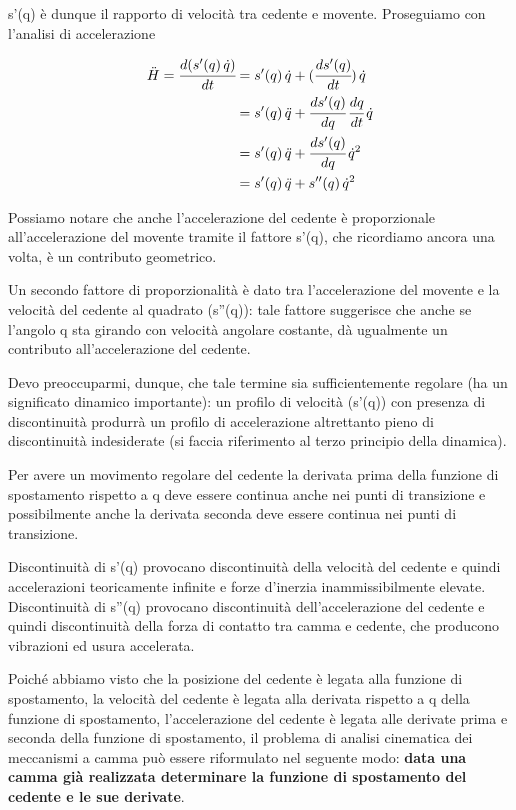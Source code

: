 	s'(q) è dunque il rapporto di velocità tra cedente e movente. Proseguiamo con l'analisi di accelerazione

	
		
		\begin{align*}
		\ddot{H} = \cfrac{d(s'(q)\,\dot{q})}{dt}&= s'(q)\,\dot{q} + (\cfrac{ds'(q)}{dt})\,\dot{q}\\
		&= s'(q) \,\ddot{q} + \cfrac{ds'(q)}{dq}\,\cfrac{dq}{dt}\,\dot{q}\\
		&= s'(q) \,\ddot{q} + \cfrac{ds'(q)}{dq}\,\dot{q}^2\\
		&= s'(q) \,\ddot{q} + s''(q)\,\dot{q}^2
		\end{align*}
		
		Possiamo notare che anche l'accelerazione del cedente è proporzionale all'accelerazione del movente tramite il fattore s'(q), che ricordiamo ancora una volta, è un contributo geometrico.\newline
		
		Un secondo fattore di proporzionalità è dato tra l'accelerazione del movente e la velocità del cedente al quadrato (s''(q)): tale fattore suggerisce che anche se l'angolo q sta girando con velocità angolare costante, dà ugualmente un contributo all'accelerazione del cedente.
		
		Devo preoccuparmi, dunque, che tale termine sia sufficientemente regolare (ha un significato dinamico importante): un profilo di velocità (s'(q)) con presenza di discontinuità produrrà un profilo di accelerazione altrettanto pieno di discontinuità indesiderate (si faccia riferimento al terzo principio della dinamica).
		
		Per avere un movimento regolare del cedente la derivata prima della funzione di spostamento rispetto a q deve essere continua anche nei punti di transizione e possibilmente anche la derivata seconda deve essere continua nei punti di transizione.
		
		Discontinuità di s'(q) provocano discontinuità della velocità del cedente e quindi accelerazioni teoricamente infinite e forze d'inerzia inammissibilmente elevate. Discontinuità di s''(q) provocano discontinuità dell'accelerazione del cedente e quindi discontinuità della forza di contatto tra camma e cedente, che producono vibrazioni ed usura accelerata.
		
		Poiché abbiamo visto che la posizione del cedente è legata alla funzione di spostamento, la velocità del cedente è legata alla derivata rispetto a q della funzione di spostamento, l'accelerazione del cedente è legata alle derivate prima e seconda della funzione di spostamento, il problema di analisi cinematica dei meccanismi a camma può essere riformulato nel seguente modo: \textbf{data una camma già realizzata determinare la funzione di spostamento del cedente e le sue derivate}.
		
